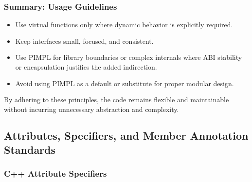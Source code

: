 \subsubsection{Summary: Usage Guidelines}

\begin{itemize}\itemsep0em
    \item Use virtual functions only where dynamic behavior is explicitly required.
    \item Keep interfaces small, focused, and consistent.
    \item Use PIMPL for library boundaries or complex internals where ABI stability or encapsulation justifies the added indirection.
    \item Avoid using PIMPL as a default or substitute for proper modular design.
\end{itemize}

By adhering to these principles, the code remains flexible and maintainable without incurring unnecessary abstraction and complexity.








\subsection{Attributes, Specifiers, and Member Annotation Standards}

\subsubsection*{C++ Attribute Specifiers}

